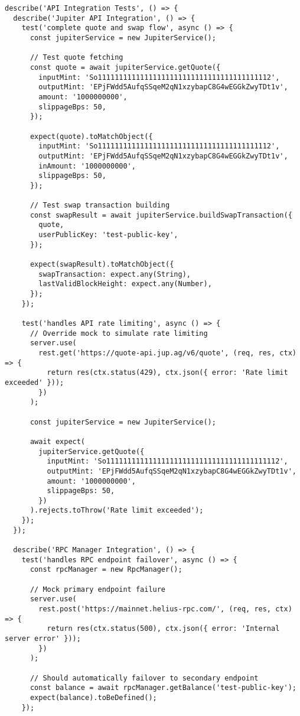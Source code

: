 \documentclass[11pt,a4paper]{article}
\begin{document}
\begin{lstlisting}[style=typescript, caption=API Integration Test Suite]
describe('API Integration Tests', () => {
  describe('Jupiter API Integration', () => {
    test('complete quote and swap flow', async () => {
      const jupiterService = new JupiterService();

      // Test quote fetching
      const quote = await jupiterService.getQuote({
        inputMint: 'So11111111111111111111111111111111111111112',
        outputMint: 'EPjFWdd5AufqSSqeM2qN1xzybapC8G4wEGGkZwyTDt1v',
        amount: '1000000000',
        slippageBps: 50,
      });

      expect(quote).toMatchObject({
        inputMint: 'So11111111111111111111111111111111111111112',
        outputMint: 'EPjFWdd5AufqSSqeM2qN1xzybapC8G4wEGGkZwyTDt1v',
        inAmount: '1000000000',
        slippageBps: 50,
      });

      // Test swap transaction building
      const swapResult = await jupiterService.buildSwapTransaction({
        quote,
        userPublicKey: 'test-public-key',
      });

      expect(swapResult).toMatchObject({
        swapTransaction: expect.any(String),
        lastValidBlockHeight: expect.any(Number),
      });
    });

    test('handles API rate limiting', async () => {
      // Override mock to simulate rate limiting
      server.use(
        rest.get('https://quote-api.jup.ag/v6/quote', (req, res, ctx) => {
          return res(ctx.status(429), ctx.json({ error: 'Rate limit exceeded' }));
        })
      );

      const jupiterService = new JupiterService();

      await expect(
        jupiterService.getQuote({
          inputMint: 'So11111111111111111111111111111111111111112',
          outputMint: 'EPjFWdd5AufqSSqeM2qN1xzybapC8G4wEGGkZwyTDt1v',
          amount: '1000000000',
          slippageBps: 50,
        })
      ).rejects.toThrow('Rate limit exceeded');
    });
  });

  describe('RPC Manager Integration', () => {
    test('handles RPC endpoint failover', async () => {
      const rpcManager = new RpcManager();

      // Mock primary endpoint failure
      server.use(
        rest.post('https://mainnet.helius-rpc.com/', (req, res, ctx) => {
          return res(ctx.status(500), ctx.json({ error: 'Internal server error' }));
        })
      );

      // Should automatically failover to secondary endpoint
      const balance = await rpcManager.getBalance('test-public-key');
      expect(balance).toBeDefined();
    });


\end{lstlisting}
\end{document}
